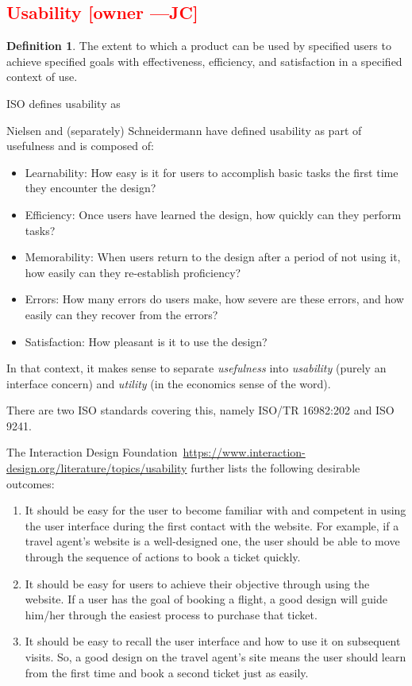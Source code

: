 \documentclass[letterpaper,cleveref]{lipics-v2019}
\newcommand{\authornote}[3]{\textcolor{#1}{[#3 ---#2]}}
\newcommand{\authornote}[3]{}
\newcommand{\jc}[1]{\authornote{red}{JC}{#1}} %
\newcommand{\notdone}[1]{\textcolor{red}{#1}}
\theoremstyle{definition}
\newtheorem{defn}{Definition}
\begin{document}
\subsection{\notdone{Usability} \jc{owner}} 

\begin{defn}
The extent to which a product can be used by specified users to achieve
specified goals with effectiveness, efficiency, and satisfaction in a specified
context of use.
\end{defn}
ISO defines usability as

Nielsen and (separately) Schneidermann have defined usability as part of usefulness and
is composed of:
\begin{itemize}
\item Learnability: How easy is it for users to accomplish basic tasks the
  first time they encounter the design?
\item Efficiency: Once users have learned the design, how quickly can they perform tasks?
\item Memorability: When users return to the design after a period of not using
  it, how easily can they re-establish proficiency?
\item Errors: How many errors do users make, how severe are these errors, and
  how easily can they recover from the errors?
\item Satisfaction: How pleasant is it to use the design?
\end{itemize}
In that context, it makes sense to separate \emph{usefulness} into
\emph{usability} (purely an interface concern) and \emph{utility} (in the economics
sense of the word).

There are two ISO standards covering this, namely ISO/TR 16982:202 and ISO 9241. 

The Interaction Design Foundation~\url{https://www.interaction-design.org/literature/topics/usability}
further lists the following desirable outcomes:

\begin{enumerate}
\item It should be easy for the user to become familiar with and competent in using
the user interface during the first contact with the website. For example, if a
travel agent’s website is a well-designed one, the user should be able to move
through the sequence of actions to book a ticket quickly.
\item It should be easy for users to achieve their objective through using the
website. If a user has the goal of booking a flight, a good design will guide
him/her through the easiest process to purchase that ticket.
\item It should be easy to recall the user interface and how to use it on
subsequent visits. So, a good design on the travel agent’s site means the user
should learn from the first time and book a second ticket just as easily.
\end{enumerate}
\end{document}
